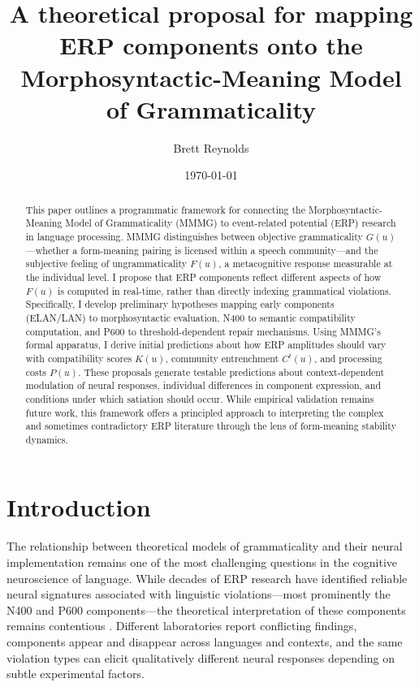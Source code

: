 \documentclass[12pt,letterpaper]{article}
\title{A theoretical proposal for mapping ERP components onto the Morphosyntactic-Meaning Model of Grammaticality}
\author{Brett Reynolds}
\date{\today}
\begin{document}
\maketitle

\begin{abstract}
This paper outlines a programmatic framework for connecting the Morphosyntactic-Meaning Model of Grammaticality (MMMG) to event-related potential (ERP) research in language processing. MMMG distinguishes between objective grammaticality $G(u)$—whether a form-meaning pairing is licensed within a speech community—and the subjective feeling of ungrammaticality $F(u)$, a metacognitive response measurable at the individual level. I propose that ERP components reflect different aspects of how $F(u)$ is computed in real-time, rather than directly indexing grammatical violations. Specifically, I develop preliminary hypotheses mapping early components (ELAN/LAN) to morphosyntactic evaluation, N400 to semantic compatibility computation, and P600 to threshold-dependent repair mechanisms. Using MMMG's formal apparatus, I derive initial predictions about how ERP amplitudes should vary with compatibility scores $K(u)$, community entrenchment $C^t(u)$, and processing costs $P(u)$. These proposals generate testable predictions about context-dependent modulation of neural responses, individual differences in component expression, and conditions under which satiation should occur. While empirical validation remains future work, this framework offers a principled approach to interpreting the complex and sometimes contradictory ERP literature through the lens of form-meaning stability dynamics.
\end{abstract}

\section{Introduction}
The relationship between theoretical models of grammaticality and their neural implementation remains one of the most challenging questions in the cognitive neuroscience of language. While decades of ERP research have identified reliable neural signatures associated with linguistic violations—most prominently the N400 and P600 components—the theoretical interpretation of these components remains contentious \autocite{Kuperberg2007, Brouwer2012, Gonda2020}. Different laboratories report conflicting findings, components appear and disappear across languages and contexts, and the same violation types can elicit qualitatively different neural responses depending on subtle experimental factors.
\end{document}
